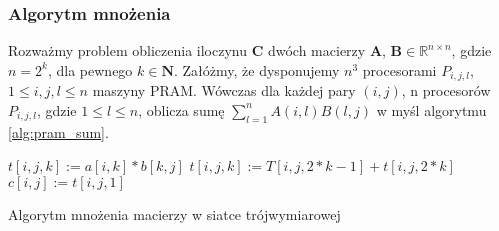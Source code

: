 

\subsubsection{Algorytm mnożenia}
Rozważmy problem obliczenia iloczynu \(\mathbf{C}\) dwóch macierzy \(\mathbf{A}\), \(\mathbf{B}\in\mathbb{R}^{n\times n}\), gdzie \(n=2^k\), dla pewnego \(k\in\mathbf{N}\). Załóżmy, że dysponujemy \(n^3\) procesorami \(P_{i,j,l}\), \(1\leq i, j, l \leq n\) maszyny PRAM. Wówczas dla każdej pary \((i, j)\), n procesorów \(P_{i,j,l}\), gdzie \(1\leq l \leq n\), oblicza sumę \(\sum_{l=1}^{n}A(i,l)B(l,j)\) w myśl algorytmu \ref{alg:pram_sum}.\\

\begin{algorithm}
\centering
\begin{algorithmic}
\State {}
\State \(t[i,j,k] := a[i,k]*b[k,j]\)
\EndParFor
{} 
\Begin
{}
\State \(t[i,j,k] := T[i,j,2*k-1]+t[i,j,2*k]\)
\EndParFor
\End
{}
\State \(c[i,j] := t[i,j,1] \)
\EndParFor
\end{algorithmic}
\caption{Algorytm mnożenia macierzy w siatce trójwymiarowej}
\label{alg:pram_sum}
\end{algorithm}



